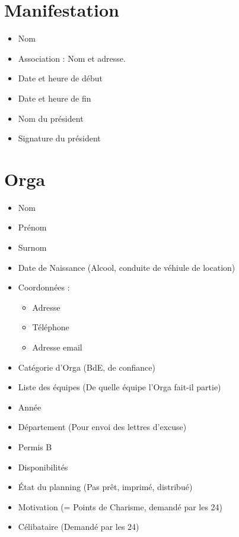 \section{Manifestation}
\begin{itemize}
 \item Nom
\item Association : Nom et adresse.
\item Date et heure de début
\item Date et heure de fin
\item Nom du président
\item Signature du président

\end{itemize}

\section{Orga}
\begin{itemize}
 \item Nom
\item Prénom
\item Surnom

\item Date de Naissance (Alcool, conduite de véhiule de location)

\item Coordonnées : \begin{itemize}
                     \item Adresse
\item Téléphone
\item Adresse email
                    \end{itemize}
\item Catégorie d'Orga (BdE, de confiance)
\item Liste des équipes (De quelle équipe l'Orga fait-il partie)
\item Année
\item Département (Pour envoi des lettres d'excuse)
\item Permis B

\item Disponibilités
\item État du planning (Pas prêt, imprimé, distribué)

\item Motivation (= Points de Charisme, demandé par les 24)
\item Célibataire (Demandé par les 24)

\end{itemize}

